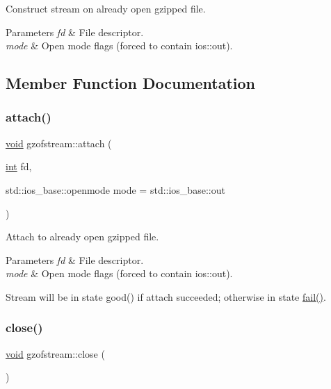 Construct stream on already open gzipped file. 


\begin{DoxyParams}{Parameters}
{\em fd} & File descriptor. \\
\hline
{\em mode} & Open mode flags (forced to contain ios\+::out). \\
\hline
\end{DoxyParams}


\subsection{Member Function Documentation}
\mbox{\label{classgzofstream_a95b76eaecd03b6cbf53d2f4b1c867439}} 
\subsubsection{\texorpdfstring{attach()}{attach()}}
{\footnotesize\ttfamily \hyperlink{lp__lib_8h_ac7828c7b2b31d2e11af17bdb6289c5d9}{void} gzofstream\+::attach (\begin{DoxyParamCaption}\item[{\hyperlink{lp__lib_8h_adeb9ec6400320e4923ac9d836d509ddb}{int}}]{fd,  }\item[{std\+::ios\+\_\+base\+::openmode}]{mode = {\ttfamily std\+:\+:ios\+\_\+base\+:\+:out} }\end{DoxyParamCaption})}



Attach to already open gzipped file. 


\begin{DoxyParams}{Parameters}
{\em fd} & File descriptor. \\
\hline
{\em mode} & Open mode flags (forced to contain ios\+::out).\\
\hline
\end{DoxyParams}
Stream will be in state good() if attach succeeded; otherwise in state \hyperlink{_constraint_macros_8h_a73a3b169ac8c3419cbe15327e75ffcfd}{fail()}. \mbox{\label{classgzofstream_a59e8b01e1c9741085f18ca456c4b8f54}} 
\subsubsection{\texorpdfstring{close()}{close()}}
{\footnotesize\ttfamily \hyperlink{lp__lib_8h_ac7828c7b2b31d2e11af17bdb6289c5d9}{void} gzofstream\+::close (\begin{DoxyParamCaption}{ }\end{DoxyParamCaption})}



